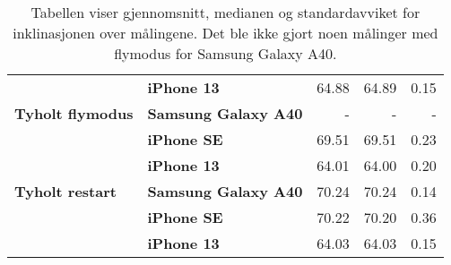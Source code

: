 \begin{table}[h!]
\begin{tabular}{llrrr}
                                            & \textbf{iPhone 13}                      & 64.88                                                                       & 64.89                                                                 & 0.15                                                                         \\
    \textbf{Tyholt flymodus}                & \textbf{Samsung Galaxy A40}                       & -                                                                           & -                                                                     & -                                                                            \\
                                            & \textbf{iPhone SE}                   & 69.51                                                                       & 69.51                                                                 & 0.23                                                                         \\
                                            & \textbf{iPhone 13}                      & 64.01                                                                       & 64.00                                                                 & 0.20                                                                         \\
    \rowcolor[HTML]{C0C0C0} 
    \textbf{Tyholt restart}                 & \textbf{Samsung Galaxy A40}                       & 70.24                                                                       & 70.24                                                                 & 0.14                                                                         \\
    \rowcolor[HTML]{C0C0C0} 
                                            & \textbf{iPhone SE}                   & 70.22                                                                       & 70.20                                                                 & 0.36                                                                         \\
    \rowcolor[HTML]{C0C0C0} 
                                            & \textbf{iPhone 13}                      & 64.03                                                                       & 64.03                                                                 & 0.15                                                                        
    \end{tabular}
    \caption{Tabellen viser gjennomsnitt, medianen og standardavviket for inklinasjonen over målingene. Det ble ikke gjort noen målinger med flymodus for Samsung Galaxy A40.}
\end{table}